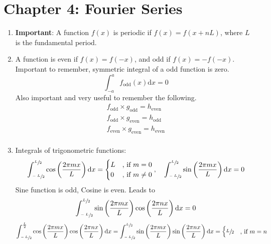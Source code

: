 \documentclass{article}
\begin{document}
\section{Chapter 4: Fourier Series}
\begin{enumerate}
\item\textbf{Important}: A function $f(x)$ is periodic if $f(x) = f(x+nL)$, where $L$ is the fundamental period.\\
\item A function is even if $f(x) = f(-x)$, and odd if $f(x) = -f(-x)$. Important to remember, symmetric integral of a odd function is zero.
\begin{equation}
\int_{-a}^{a}f_{\text{odd}}(x)\mathrm{d}x=0
\label{eq:oddint}
\end{equation}
Also important and very useful to remember the following. 
\begin{align*}
f_{\text{odd}}\times g_{\text{odd}} = h_{\text{even}}\\ f_{\text{odd}}\times g_{\text{even}} = h_{\text{odd}}\\ f_{\text{even}}\times g_{\text{even}} = h_{\text{even}}\\
\end{align*}
\item Integrals of trigonometric functions:
\begin{equation}
\int_{\sfrac{-L}{2}}^{\sfrac{L}{2}}\mathrm{cos}\left(\frac{2\pi m x}{L}\right)\mathrm{d}x=
		\begin{cases}
			L & \text{, if } m=0\\
			0 & \text{, if } m\neq 0
		\end{cases}
,\quad
\int_{\sfrac{-L}{2}}^{\sfrac{L}{2}}\mathrm{sin}\left(\frac{2\pi m x}{L}\right)\mathrm{d}x=0
\end{equation}
Sine function is odd, Cosine is even. Leads to
\begin{equation}
\int_{\sfrac{-L}{2}}^{\sfrac{L}{2}}\mathrm{sin}\left(\frac{2\pi m x}{L}\right)\mathrm{cos}\left(\frac{2\pi n x}{L}\right)\mathrm{d}x=0
\end{equation}
\begin{equation}
\int_{\sfrac{-L}{2}}^{\frac{L}{2}}\mathrm{cos}\left(\frac{2\pi m x}{L}\right)\mathrm{cos}\left(\frac{2\pi n x}{L}\right)\mathrm{d}x = \int_{\sfrac{-L}{2}}^{\sfrac{L}{2}}\mathrm{sin}\left(\frac{2\pi m x}{L}\right)\mathrm{sin}\left(\frac{2\pi n x}{L}\right)\mathrm{d}x=
		\begin{cases}
			\sfrac{L}{2} & \text{, if } m=n\\

\end{cases}
\end{equation}
\end{enumerate}
\end{document}

